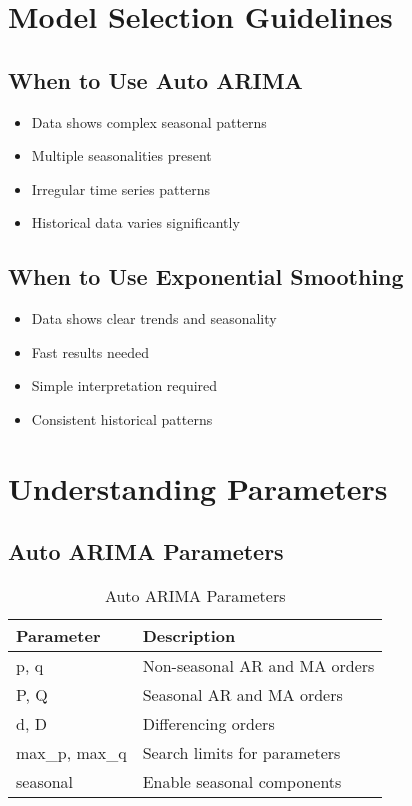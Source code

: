\section{Model Selection Guidelines}

\subsection{When to Use Auto ARIMA}
\begin{itemize}
	\item Data shows complex seasonal patterns
	\item Multiple seasonalities present
	\item Irregular time series patterns
	\item Historical data varies significantly
\end{itemize}

\subsection{When to Use Exponential Smoothing}
\begin{itemize}
	\item Data shows clear trends and seasonality
	\item Fast results needed
	\item Simple interpretation required
	\item Consistent historical patterns
\end{itemize}

\section{Understanding Parameters}

\subsection{Auto ARIMA Parameters}
\begin{table}[h]
	\centering
	\begin{tabular}{|l|l|}
		\hline
		\textbf{Parameter} & \textbf{Description} \\
		\hline
		p, q & Non-seasonal AR and MA orders \\
		P, Q & Seasonal AR and MA orders \\
		d, D & Differencing orders \\
		max\_p, max\_q & Search limits for parameters \\
		seasonal & Enable seasonal components \\
		\hline
	\end{tabular}
	\caption{Auto ARIMA Parameters}
\end{table}

